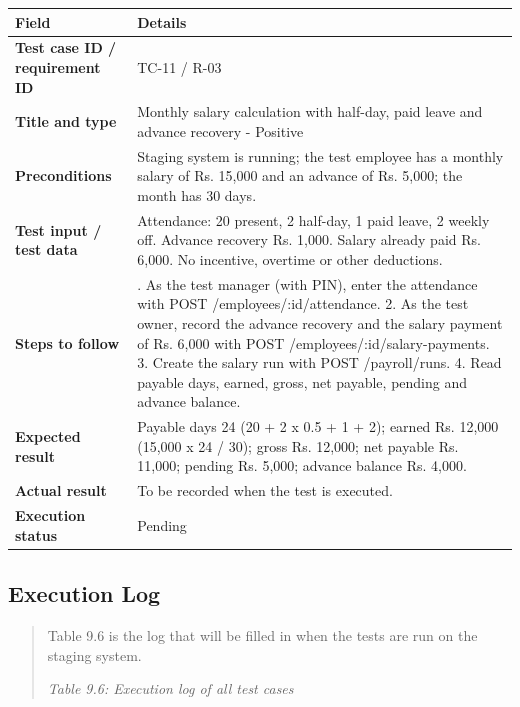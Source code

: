 \documentclass[12pt,a4paper]{article}
\providecommand{\real}[1]{#1}
\begin{document}
\begin{longtable}[]{@{}
  >{\raggedright\arraybackslash}p{(\columnwidth - 2\tabcolsep) * \real{0.2541}}
  >{\raggedright\arraybackslash}p{(\columnwidth - 2\tabcolsep) * \real{0.7459}}@{}}
\toprule\noalign{}
\textbf{Field} & \textbf{Details} \\
\midrule\noalign{}
\endhead
\bottomrule\noalign{}
\endlastfoot
\textbf{Test case ID / requirement ID} & TC-11 / R-03 \\
\textbf{Title and type} & Monthly salary calculation with half-day, paid
leave and advance recovery - Positive \\
\textbf{Preconditions} & Staging system is running; the test employee
has a monthly salary of Rs. 15,000 and an advance of Rs. 5,000; the
month has 30 days. \\
\textbf{Test input / test data} & Attendance: 20 present, 2 half-day, 1
paid leave, 2 weekly off. Advance recovery Rs. 1,000. Salary already
paid Rs. 6,000. No incentive, overtime or other deductions. \\
\textbf{Steps to follow} & 1. As the test manager (with PIN), enter the
attendance with POST /employees/:id/attendance. 2. As the test owner,
record the advance recovery and the salary payment of Rs. 6,000 with
POST /employees/:id/salary-payments. 3. Create the salary run with POST
/payroll/runs. 4. Read payable days, earned, gross, net payable, pending
and advance balance. \\
\textbf{Expected result} & Payable days 24 (20 + 2 x 0.5 + 1 + 2);
earned Rs. 12,000 (15,000 x 24 / 30); gross Rs. 12,000; net payable Rs.
11,000; pending Rs. 5,000; advance balance Rs. 4,000. \\
\textbf{Actual result} & To be recorded when the test is executed. \\
\textbf{Execution status} & Pending \\
\end{longtable}

\subsection{Execution Log}\label{execution-log}

\begin{quote}
Table 9.6 is the log that will be filled in when the tests are run on
the staging system.

\emph{Table 9.6: Execution log of all test cases}
\end{quote}
\end{document}
